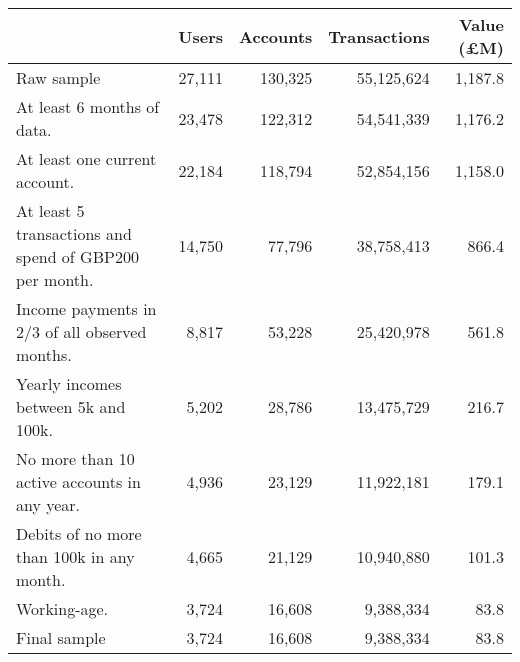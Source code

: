 \begin{tabular}{lrrrr}
\toprule
                                                        &   Users & Accounts & Transactions & Value (\pounds M) \\
\midrule
                                             Raw sample &  27,111 &  130,325 &   55,125,624 &           1,187.8 \\
                             At least 6 months of data. &  23,478 &  122,312 &   54,541,339 &           1,176.2 \\
                          At least one current account. &  22,184 &  118,794 &   52,854,156 &           1,158.0 \\
 At least 5 transactions and spend of GBP200 per month. &  14,750 &   77,796 &   38,758,413 &             866.4 \\
         Income payments in 2/3 of all observed months. &   8,817 &   53,228 &   25,420,978 &             561.8 \\
                    Yearly incomes between 5k and 100k. &   5,202 &   28,786 &   13,475,729 &             216.7 \\
           No more than 10 active accounts in any year. &   4,936 &   23,129 &   11,922,181 &             179.1 \\
              Debits of no more than 100k in any month. &   4,665 &   21,129 &   10,940,880 &             101.3 \\
                                           Working-age. &   3,724 &   16,608 &    9,388,334 &              83.8 \\
                                           Final sample &   3,724 &   16,608 &    9,388,334 &              83.8 \\
\bottomrule
\end{tabular}
